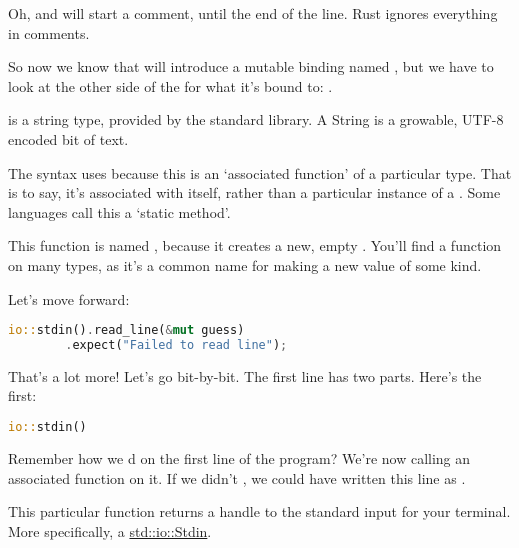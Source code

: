 Oh, and \code{//} will start a comment, until the end of the line. Rust ignores everything in comments.

\blank

So now we know that  will introduce a mutable binding named , but we have to look at the 
other side of the \code{=} for what it’s bound to: .

\blank

 is a string type, provided by the standard library. A String is a growable, UTF-8 encoded bit of text.

\blank

The  syntax uses \code{::} because this is an ‘associated function’ of a particular type. That is to say, it’s
associated with  itself, rather than a particular instance of a . Some languages call this a 
‘static method’.

\blank

This function is named , because it creates a new, empty . You’ll find a  function on 
many types, as it’s a common name for making a new value of some kind.

\blank

Let’s move forward:

\begin{lstlisting}[language=Rust]
    io::stdin().read_line(&mut guess)
        .expect("Failed to read line");

\end{lstlisting}

That’s a lot more! Let’s go bit-by-bit. The first line has two parts. Here’s the first:

\begin{lstlisting}[language=Rust]
io::stdin()
\end{lstlisting}

Remember how we d  on the first line of the program? We’re now calling an associated 
function on it. If we didn’t , we could have written this line as .

\blank

This particular function returns a handle to the standard input for your terminal. More specifically, a 
\href{https://doc.rust-lang.org/std/io/struct.Stdin.html}{std::io::Stdin}.

\blank

